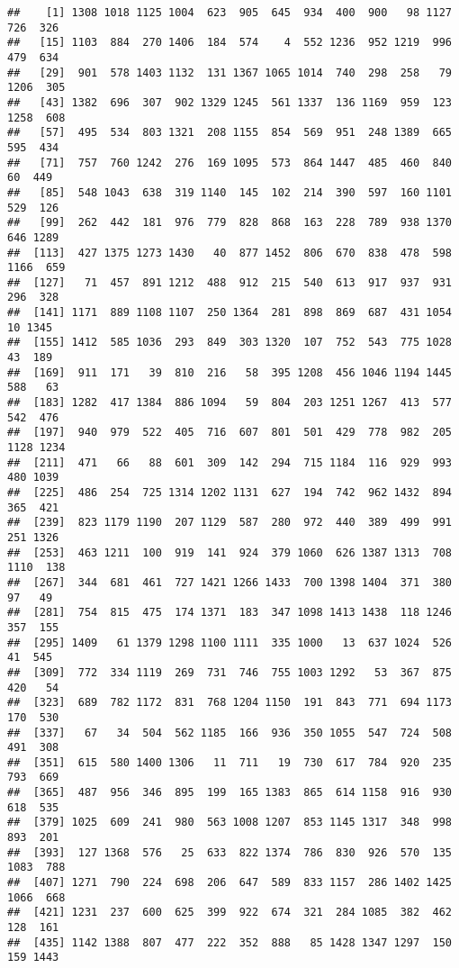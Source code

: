 \documentclass[
]{article}
\begin{document}
\begin{verbatim}
##    [1] 1308 1018 1125 1004  623  905  645  934  400  900   98 1127  726  326
##   [15] 1103  884  270 1406  184  574    4  552 1236  952 1219  996  479  634
##   [29]  901  578 1403 1132  131 1367 1065 1014  740  298  258   79 1206  305
##   [43] 1382  696  307  902 1329 1245  561 1337  136 1169  959  123 1258  608
##   [57]  495  534  803 1321  208 1155  854  569  951  248 1389  665  595  434
##   [71]  757  760 1242  276  169 1095  573  864 1447  485  460  840   60  449
##   [85]  548 1043  638  319 1140  145  102  214  390  597  160 1101  529  126
##   [99]  262  442  181  976  779  828  868  163  228  789  938 1370  646 1289
##  [113]  427 1375 1273 1430   40  877 1452  806  670  838  478  598 1166  659
##  [127]   71  457  891 1212  488  912  215  540  613  917  937  931  296  328
##  [141] 1171  889 1108 1107  250 1364  281  898  869  687  431 1054   10 1345
##  [155] 1412  585 1036  293  849  303 1320  107  752  543  775 1028   43  189
##  [169]  911  171   39  810  216   58  395 1208  456 1046 1194 1445  588   63
##  [183] 1282  417 1384  886 1094   59  804  203 1251 1267  413  577  542  476
##  [197]  940  979  522  405  716  607  801  501  429  778  982  205 1128 1234
##  [211]  471   66   88  601  309  142  294  715 1184  116  929  993  480 1039
##  [225]  486  254  725 1314 1202 1131  627  194  742  962 1432  894  365  421
##  [239]  823 1179 1190  207 1129  587  280  972  440  389  499  991  251 1326
##  [253]  463 1211  100  919  141  924  379 1060  626 1387 1313  708 1110  138
##  [267]  344  681  461  727 1421 1266 1433  700 1398 1404  371  380   97   49
##  [281]  754  815  475  174 1371  183  347 1098 1413 1438  118 1246  357  155
##  [295] 1409   61 1379 1298 1100 1111  335 1000   13  637 1024  526   41  545
##  [309]  772  334 1119  269  731  746  755 1003 1292   53  367  875  420   54
##  [323]  689  782 1172  831  768 1204 1150  191  843  771  694 1173  170  530
##  [337]   67   34  504  562 1185  166  936  350 1055  547  724  508  491  308
##  [351]  615  580 1400 1306   11  711   19  730  617  784  920  235  793  669
##  [365]  487  956  346  895  199  165 1383  865  614 1158  916  930  618  535
##  [379] 1025  609  241  980  563 1008 1207  853 1145 1317  348  998  893  201
##  [393]  127 1368  576   25  633  822 1374  786  830  926  570  135 1083  788
##  [407] 1271  790  224  698  206  647  589  833 1157  286 1402 1425 1066  668
##  [421] 1231  237  600  625  399  922  674  321  284 1085  382  462  128  161
##  [435] 1142 1388  807  477  222  352  888   85 1428 1347 1297  150  159 1443

\end{verbatim}
\end{document}
